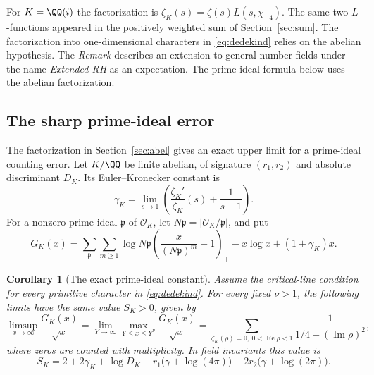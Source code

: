 \documentclass[a4paper,11pt]{article}
\newtheorem{corollary}[proposition]{Corollary}
\theoremstyle{definition}
\theoremstyle{remark}
\newcommand{\real}{\operatorname{Re}}\newcommand{\imag}{\operatorname{Im}}
\numberwithin{equation}{section}
\begin{document}
For \(K=\QQ(i)\) the factorization is \(\zeta_K(s)=\zeta(s)L(s,\chi_{-4})\). The same two \(L\)-functions appeared in the positively weighted sum of Section~\ref{sec:sum}. The factorization into one-dimensional characters in \eqref{eq:dedekind} relies on the abelian hypothesis. The \emph{Remark} describes an extension to general number fields under the name \emph{Extended RH} as an expectation. The prime-ideal formula below uses the abelian factorization.

\subsection{The sharp prime-ideal error}\label{nav:I-15}
\label{sec:primeideal}
The factorization in Section~\ref{sec:abel} gives an exact upper limit for a prime-ideal counting error. Let \(K/\QQ\) be finite abelian, of signature \((r_1,r_2)\) and absolute discriminant \(D_K\). Its Euler--Kronecker constant is
\[
 \gamma_K=\lim_{s\to1}\left(\frac{\zeta_K'}{\zeta_K}(s)+\frac1{s-1}\right).
\]
For a nonzero prime ideal \(\mathfrak p\) of \(\mathcal O_K\), let \(N\mathfrak p=|\mathcal O_K/\mathfrak p|\), and put
\[
 G_K(x)=\sum_{\mathfrak p}\sum_{m\ge1}\log N\mathfrak p
             \left(\frac{x}{(N\mathfrak p)^m}-1\right)_+
                   -x\log x+(1+\gamma_K)x .
\]
\begin{corollary}[The exact prime-ideal constant]\label{cor:idealpeaks}
Assume the critical-line condition for every primitive character in \eqref{eq:dedekind}. For every fixed \(\nu>1\), the following limits have the same value \(S_K>0\), given by
\[
 \limsup_{x\to\infty}\frac{G_K(x)}{\sqrt x}
       =\lim_{Y\to\infty}\max_{Y\le x\le Y^\nu}\frac{G_K(x)}{\sqrt x}
       =\sum_{\zeta_K(\rho)=0,\ 0<\real\rho<1}\frac1{1/4+(\imag\rho)^2},
\]
where zeros are counted with multiplicity. In field invariants this value is
\[
 S_K=2+2\gamma_K+\log D_K-r_1\big(\gamma+\log(4\pi)\big)
                               -2r_2\big(\gamma+\log(2\pi)\big).
\]
\end{corollary}
\end{document}
